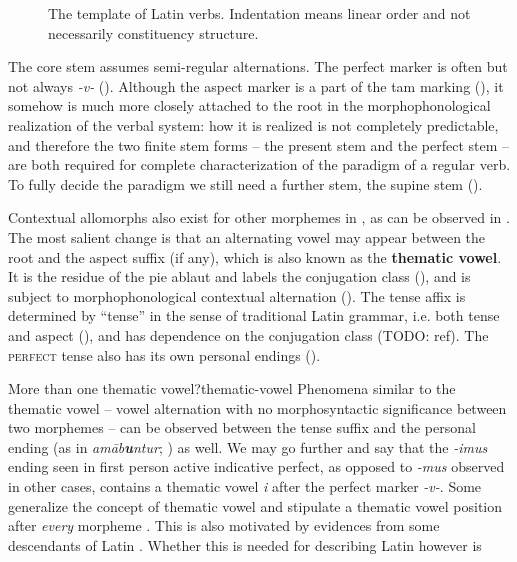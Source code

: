\documentclass[a4paper, oneside, 12pt]{report}
\newcommand*{\citepage}[1]{p.~{#1}}
\newcommand*{\concept}[1]{\textbf{#1}}
\newcommand{\form}[1]{\emph{#1}}
\newcommand*{\category}[1]{\textsc{#1}}
\begin{document}
\begin{figure}[H]
    \centering
    
    \caption{The template of Latin verbs.
    Indentation means linear order and not necessarily constituency structure.}
    \label{fig:latin-verb}
\end{figure}

The core stem assumes semi-regular alternations.
The perfect marker is often but not always \form{-v-} ().
Although the aspect marker is a part of the \acs{tam} marking
(),
it somehow is much more closely attached to the root 
in the morphophonological realization of the verbal system:
how it is realized is not completely predictable,
and therefore the two finite stem forms -- 
the present stem and the perfect stem -- 
are both required for complete characterization of the paradigm of a regular verb.
To fully decide the paradigm 
we still need a further stem, the supine stem
().

Contextual allomorphs also exist for other morphemes in 
\citep[\citepage{11}]{embick2005status},
as can be observed in .
The most salient change is that 
an alternating vowel may appear between the root and the aspect suffix (if any),
which is also known as the \concept{thematic vowel}.
It is the residue of the \ac{pie} ablaut
and labels the conjugation class
(),
and is subject to morphophonological contextual alternation
().
The tense affix is determined by ``tense'' in the sense of traditional Latin grammar, 
i.e. both tense and aspect (),
and has dependence on the conjugation class (TODO: ref).
The \category{perfect} tense also has its own personal endings ().

\begin{infobox}{More than one thematic vowel?}{thematic-vowel}
    Phenomena similar to the thematic vowel -- vowel alternation with no morphosyntactic significance 
    between two morphemes -- can be observed 
    between the tense suffix and the personal ending 
    (as in \form{am\={a}b\textbf{u}ntur}; ) as well.
    We may go further and say that
    the \form{-imus} ending seen in first person active indicative perfect,
    as opposed to \form{-mus} observed in other cases, 
    contains a thematic vowel \form{i} after the perfect marker \form{-v-}.
    Some generalize the concept of thematic vowel and 
    stipulate a thematic vowel position after \emph{every} morpheme
    \cite{embick2003latin}.
    This is also motivated by evidences from some descendants of Latin 
    \citep{oltra1999notion,oltra2005stress}.
    Whether this is needed for describing Latin however is 
\end{infobox}
\end{document}
